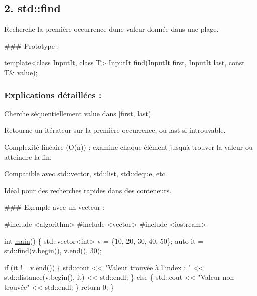 \subsection*{2. {\bfseries std\+::find}}

Recherche la première occurrence d\textquotesingle{}une valeur donnée dans une plage.

\#\#\# Prototype \+: 
\begin{DoxyCode}
\textcolor{keyword}{template}<\textcolor{keyword}{class} InputIt, \textcolor{keyword}{class} T>
InputIt find(InputIt first, InputIt last, \textcolor{keyword}{const} T& value);
\end{DoxyCode}


\subsubsection*{Explications détaillées \+:}


\begin{DoxyItemize}
\item Cherche séquentiellement {\ttfamily value} dans {\ttfamily \mbox{[}first, last)}.
\item Retourne un itérateur sur la première occurrence, ou {\ttfamily last} si introuvable.
\item Complexité linéaire (O(n)) \+: examine chaque élément jusqu\textquotesingle{}à trouver la valeur ou atteindre la fin.
\item Compatible avec {\ttfamily std\+::vector}, {\ttfamily std\+::list}, {\ttfamily std\+::deque}, etc.
\item Idéal pour des recherches rapides dans des conteneurs.
\end{DoxyItemize}

\#\#\# Exemple avec un vecteur \+: 
\begin{DoxyCode}
\textcolor{preprocessor}{#include <algorithm>}
\textcolor{preprocessor}{#include <vector>}
\textcolor{preprocessor}{#include <iostream>}

\textcolor{keywordtype}{int} \hyperlink{htop_8c_a3c04138a5bfe5d72780bb7e82a18e627}{main}() \{
    std::vector<int> v = \{10, 20, 30, 40, 50\};
    \textcolor{keyword}{auto} it = std::find(v.begin(), v.end(), 30);

    \textcolor{keywordflow}{if} (it != v.end()) \{
        std::cout << \textcolor{stringliteral}{"Valeur trouvée à l'index : "} << std::distance(v.begin(), it) << std::endl;
    \} \textcolor{keywordflow}{else} \{
        std::cout << \textcolor{stringliteral}{"Valeur non trouvée"} << std::endl;
    \}
    \textcolor{keywordflow}{return} 0;
\}
\end{DoxyCode}
 



